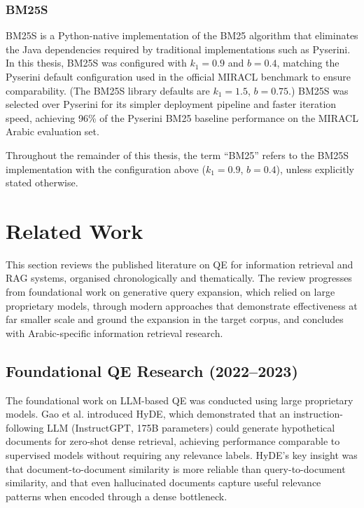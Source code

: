 \subsubsection{BM25S}
\label{sec:bm25s}

BM25S \cite{bm25s_2024} is a Python-native implementation of the BM25 algorithm that eliminates the Java dependencies required by traditional implementations such as Pyserini. In this thesis, BM25S was configured with $k_1 = 0.9$ and $b = 0.4$, matching the Pyserini default configuration used in the official MIRACL benchmark to ensure comparability. (The BM25S library defaults are $k_1 = 1.5$, $b = 0.75$.) BM25S was selected over Pyserini for its simpler deployment pipeline and faster iteration speed, achieving 96\% of the Pyserini BM25 baseline performance on the MIRACL Arabic evaluation set.

Throughout the remainder of this thesis, the term ``BM25'' refers to the BM25S implementation with the configuration above ($k_1 = 0.9$, $b = 0.4$), unless explicitly stated otherwise.

\section{Related Work}
\label{sec:related_work}

This section reviews the published literature on QE for information retrieval and RAG systems, organised chronologically and thematically. The review progresses from foundational work on generative query expansion, which relied on large proprietary models, through modern approaches that demonstrate effectiveness at far smaller scale and ground the expansion in the target corpus, and concludes with Arabic-specific information retrieval research.

\subsection{Foundational QE Research (2022--2023)}
\label{sec:foundational_qe}

The foundational work on LLM-based QE was conducted using large proprietary models. Gao et al. \cite{gao_2022_precise} introduced HyDE, which demonstrated that an instruction-following LLM (InstructGPT, 175B parameters) could generate hypothetical documents for zero-shot dense retrieval, achieving performance comparable to supervised models without requiring any relevance labels. HyDE's key insight was that document-to-document similarity is more reliable than query-to-document similarity, and that even hallucinated documents capture useful relevance patterns when encoded through a dense bottleneck.

